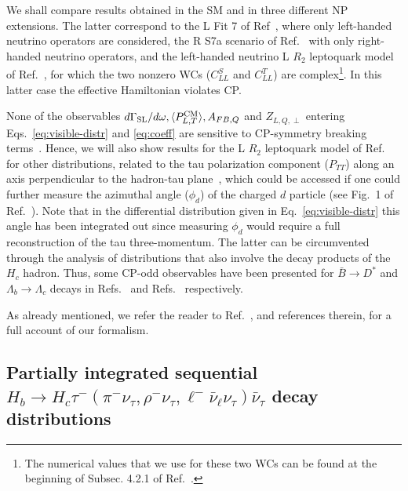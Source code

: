 \documentclass[aps,superscriptaddress,showpacs,nofootinbib,11pt]{revtex4-1}
\begin{document}
We shall compare results obtained in the SM and in three different NP extensions. The latter correspond to the L Fit 7 of Ref~\cite{Murgui:2019czp}, where only left-handed neutrino operators are considered, the R S7a scenario of Ref.~\cite{Mandal:2020htr}
 with only right-handed neutrino operators, and the left-handed neutrino  L $R_2$ leptoquark model of Ref.~\cite{Shi:2019gxi}, for which the two nonzero WCs ($C^S_{LL}$ and $C^T_{LL}$) are complex\footnote{The numerical values that we use for  these two WCs can be found at the beginning of Subsec. 4.2.1 of Ref.~\cite{Penalva:2021gef}.}. In this latter case
the effective Hamiltonian  violates CP. 

None of the observables $d\Gamma_{\rm SL}/d\omega,\langle P^{\rm CM}_{L,T}\rangle, A_{FB,Q}$ and $ Z_{L,Q,\perp}$
entering Eqs.~\eqref{eq:visible-distr} and \eqref{eq:coeff} are   sensitive to CP-symmetry breaking terms~\cite{Penalva:2021gef,Penalva:2021wye}. Hence, we will also show results for the L $R_2$ leptoquark model of  Ref.~\cite{Shi:2019gxi} for other distributions, related to the tau polarization
component ($P_{TT}$) along an axis perpendicular to the hadron-tau plane~\cite{Penalva:2021gef},
which could be accessed if one could further measure the azimuthal  angle ($\phi_d$)  of the  charged  $d$ particle (see Fig.~1 of Ref.~\cite{Penalva:2022vxy}). Note that in the differential distribution given in Eq.~\eqref{eq:visible-distr} this angle has been integrated out since measuring $\phi_d$ would require a full reconstruction of the tau three-momentum.
    The latter can be circumvented  through the analysis
  of  distributions that also involve the decay products of the $H_c$ hadron. Thus,
  some CP-odd observables have been presented for $\bar B \to D^*$  and $\Lambda_b\to
   \Lambda_c$ decays  in Refs.~\cite{Duraisamy:2013pia, 
Duraisamy:2014sna, Ligeti:2016npd, Bhattacharya:2020lfm}  and Refs.~\cite{Boer:2019zmp,Hu:2020axt} respectively.
%

As already mentioned, we refer the reader to   Ref.~\cite{Penalva:2021wye}, and references therein,  for a full account of our formalism. 







 \subsection{Partially integrated sequential 
$H_b\to H_c\tau^-(\pi^-\nu_\tau,\rho^-\nu_\tau,\ell^-\bar\nu_\ell\nu_\tau)\bar\nu_\tau$ decay distributions}
\end{document}
